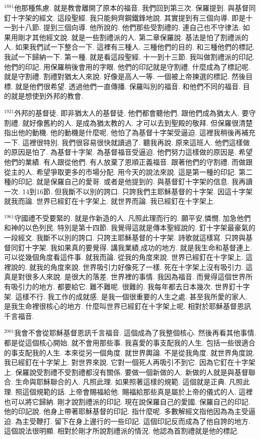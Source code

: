 \documentclass{book}
\begin{document}
$^{1881}$他那種焦慮.
就是教會離開了原本的福音.
我們回到第三次.
保羅提到.
與基督同釘十字架的經文.
這段聖經.
我只能夠齊鋼鐵鋒地說.
其實提到有三個向導.
即是十一到十八節.
提到三個向導.
他所說的.
他們那些受割禮的.
連自己也不守律法.
如果用剛才其他經文說.
就是一些割禮派的人.
第二章保羅說.
基法是怕了割禮派的人.
如果我們試一下整合一下.
這裡有三種人.
三種他們的目的.
和三種他們的標記.
我試一下歸納一下.
第一種.
就是看這段聖經.
十一到十三節.
我叫做割禮派的印記.
他們的印記.
用保羅稍後會用的字眼.
他們的印記就是守割禮.
什麼成為了標記呢.
就是守割禮.
割禮對猶太人來說.
好像是高人一等.
一個被上帝揀選的標記.
然後目標.
就是他們很希望.
透過他們一直傳播.
保羅叫別的福音.
和他們不同的福音.
目的就是想使到外邦的教會.

$^{1921}$外邦的基督徒.
即非猶太人的基督徒.
他們都會聽他們.
跟他們成為猶太人.
要守割禮.
就好像舊約的人.
是成為猶太教的人.
才可以去到聖殿的敬拜.
但保羅很清楚指出他的動機.
他的動機是什麼呢.
他怕了為基督十字架受逼迫.
這裡我稍後再補充一下.
這裡很特別.
我們很容易很快就讀過了.
聽我再說.
原來這班人.
他們這樣做的原因是怕了.
為基督十字架.
為基督福音受逼迫.
他們努力這樣做的原因是.
希望他們的業績.
有人跟從他們.
有人放棄了恩順正義福音.
跟著他們的守割禮.
而做跟從主的人.
希望爭取更多的市場分配.
用今天的說法來說.
這是第一種的印記.
第二種的印記.
就是保羅自己的愛哥.
或者是他提到的.
與基督釘十字架的信息.
我再讀一次.
14到16節.
但我斷不以別的誇口.
只誇我們主耶穌基督的十字架.
因這十字架就我而論.
世界已經釘在十字架上.
就世界而論.
我已經釘在十字架上.

$^{1961}$守國禮不受要緊的.
就是作新造的人.
凡照此理而行的.
願平安,憐憫.
加急他們和神的以色列民.
特別是第十四節.
我覺得這就是傳本聖經說的.
釘十字架最豪氣的一段經文.
我斷不以別的誇口.
只誇主耶穌基督的十字架.
詩歌就這樣寫.
只誇與基督同釘十字架.
我如果真的要覺得.
講我業績,成功的地方.
就是我生命和基督連上.
可以從幾個角度看這件事.
就我而論.
從我的角度來說.
世界已經釘在十字架上.
這裡說的.
就我的角度來說.
世界吸引力好像死了一樣.
死在十字架上沒有吸引力.
這真是對很多人來說.
是很大的落差.
世界裡的事情.
我因為福音.
而覺得這個世界所有吸引力的地方.
都要給它.
難不難呢.
很難的.
我每年都去日本幾次.
世界釘十字架.
這樣不行.
我工作的成就感.
是我一個很重要的人生之處.
甚至我所愛的家人.
是我生命裡很核心的地方.
什麼叫世界已經釘在十字架上呢.
相對於耶穌基督恩訊千言福音.

$^{2001}$我會不會從耶穌基督恩訊千言福音.
這個成為了我整個核心.
然後再看其他事情.
都是從這個核心開始.
就不會用那些事.
我喜愛的事支配我的人生.
包括一些很適合的事支配我的人生.
本來從另一個角度.
就世界輿論.
不是從我角度.
就世界角度說.
我已經釘在十字架上.
對世界來說.
它對一個死人再吸引不到它.
因為它釘在十字架上.
保羅說受割禮不受割禮都沒有關係.
要做一個新做的人.
新做的人就是與基督聯合.
生命與耶穌聯合的人.
凡照此理.
如果照著這樣的規範.
這個就是正典.
凡照此理.
照這個規範的話.
上帝會賜福給他.
賜福給那些真是屬於上帝的儀式的人.
這裡也可以將它歸納.
剛才說割禮派的印記.
現在說保羅自己的愛國.
保羅自己的印記.
他的印記說.
他身上帶著耶穌基督的印記.
指什麼呢.
多數解經文指他因為為主受逼迫.
為主受鞭打.
留下在身上邊行的一些印記.
這個印記反而成為了他自誇的地方.
這個說法很明顯.
相對於剛才所說割禮派的情況.
他認為首割禮就是他的標記.
\end{document}
